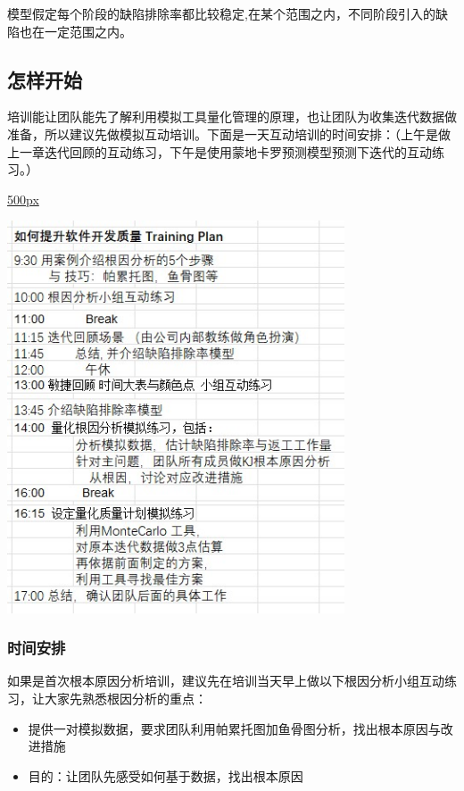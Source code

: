 模型假定每个阶段的缺陷排除率都比较稳定,在某个范围之内，不同阶段引入的缺陷也在一定范围之内。

\hypertarget{ux600eux6837ux5f00ux59cb}{%
\subsection{怎样开始}\label{ux600eux6837ux5f00ux59cb}}

培训能让团队能先了解利用模拟工具量化管理的原理，也让团队为收集迭代数据做准备，所以建议先做模拟互动培训。下面是一天互动培训的时间安排：（上午是做上一章迭代回顾的互动练习，下午是使用蒙地卡罗预测模型预测下迭代的互动练习。）

\href{文件:712trainingAgendaScreenshot_2022-07-12_125030.jpg}{500px}

\includegraphics[width=10cm]{712trainingAgendaScreenshot_2022-07-12_125030.jpg}

\hypertarget{ux65f6ux95f4ux5b89ux6392}{%
\subsubsection{时间安排}\label{ux65f6ux95f4ux5b89ux6392}}

如果是首次根本原因分析培训，建议先在培训当天早上做以下根因分析小组互动练习，让大家先熟悉根因分析的重点：

\begin{itemize}
\tightlist
\item
  提供一对模拟数据，要求团队利用帕累托图加鱼骨图分析，找出根本原因与改进措施
\item
  目的：让团队先感受如何基于数据，找出根本原因
\end{itemize}

